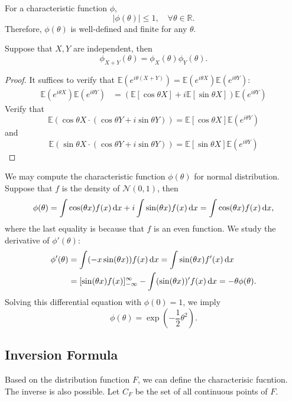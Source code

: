 \begin{corollary}
For a characteristic function $\phi$,
\[
|\phi(\theta)|\le 1,\quad\forall\theta\in\mathbb{R}.
\]
Therefore, $\phi(\theta)$ is well-defined and finite for any $\theta$.
\end{corollary}

\begin{proposition}
Suppose that $X,Y$ are independent, then 
\[
\phi_{X+Y}(\theta) = \phi_X(\theta)\phi_Y(\theta).
\]
\end{proposition}
\begin{proof}
It suffices to verify that $\mathbb{E}(e^{i\theta(X+Y)})=\mathbb{E}(e^{i\theta X})\mathbb{E}(e^{i\theta Y})$:
\begin{align*}
\mathbb{E}(e^{i\theta X})\mathbb{E}(e^{i\theta Y})&=(\mathbb{E}[\cos\theta X]+i\mathbb{E}[\sin\theta X])\mathbb{E}(e^{i\theta Y})
\end{align*}
Verify that 
\[
\mathbb{E}\left(
\cos\theta X\cdot(\cos\theta Y + i\sin\theta Y)
\right)
=
\mathbb{E}[\cos\theta X]\mathbb{E}(e^{i\theta Y})
\]
and
\[
\mathbb{E}\left(
\sin\theta X\cdot(\cos\theta Y + i\sin\theta Y)
\right)
=
\mathbb{E}[\sin\theta X]\mathbb{E}(e^{i\theta Y})
\]
\end{proof}

We may compute the characteristic function $\phi(\theta)$ for normal distribution.
Suppose that $f$ is the density of $\mathcal{N}(0,1)$, then
\[
\phi(\theta) = \int\cos(\theta x)f(x)\,\mathrm{d} x + i \int\sin(\theta x)f(x)\,\mathrm{d} x =\int\cos(\theta x)f(x)\,\mathrm{d} x,
\]
where the last equality is because that $f$ is an even function.
We study the derivative of $\phi'(\theta)$:
\begin{align*}
\phi'(\theta)&=\int(-x\sin(\theta x))f(x)\,\mathrm{d} x=\int\sin(\theta x)f'(x)\,\mathrm{d} x\\
&=[\sin(\theta x)f(x)]_{-\infty}^\infty - \int (\sin(\theta x))'f(x)\,\mathrm{d} x = -\theta\phi(\theta).
\end{align*}
Solving this differential equation with $\phi(0)=1$, we imply 
\[
\phi(\theta) = \exp\left(-\frac{1}{2}\theta^2\right).
\]

\subsection{Inversion Formula}

Based on the distribution function $F$, we can define the characterisic fucntion.
The inverse is also possible. 
Let $C_F$ be the set of all continuous points of $F$.

